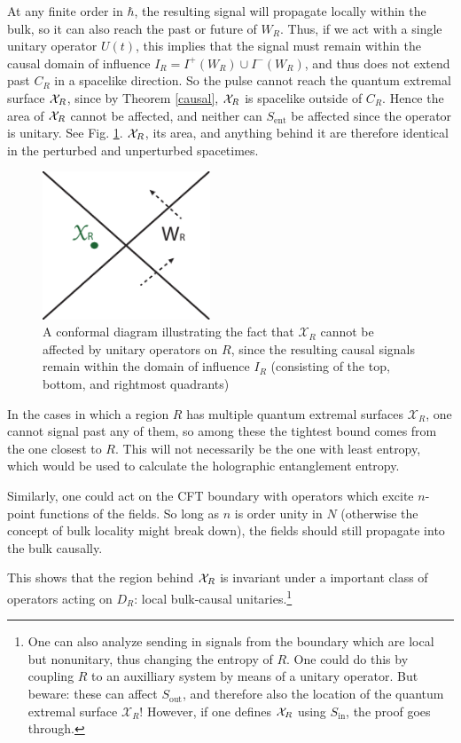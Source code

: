 \documentclass[12pt]{article}
\theoremstyle{remark}
\numberwithin{equation}{section}
\numberwithin{equation}{section}
\begin{document}
At any finite order in $\hbar$, the resulting signal will propagate locally within the bulk, so it can also reach the past or future of $W_R$.  Thus, if we act with a single unitary operator $U(t)$, this implies that the signal must remain within the causal domain of influence $I_R = I^+(W_R) \cup I^-(W_R)$, and thus does not extend past $C_R$ in a spacelike direction.  So the pulse cannot reach the quantum extremal surface ${\cal X}_R$, since by Theorem \ref{causal}, ${\cal X}_R$ is spacelike outside of $C_R$.  Hence the area of ${\cal X}_R$ cannot be affected, and neither can $S_\mathrm{ent}$ be affected since the operator is unitary.  See Fig. \ref{CausalSignal}.  ${\cal X}_R$, its area, and anything behind it are therefore identical in the perturbed and unperturbed spacetimes.

\begin{figure}[ht]
\begin{center}
\includegraphics[width=5cm]{CausalSignalsv2.pdf} 
\caption{\small{A conformal diagram illustrating the fact that $\mathcal{X}_{R}$ cannot be affected by unitary operators on $R$, since the resulting causal signals remain within the domain of influence $I_R$ (consisting of the top, bottom, and rightmost quadrants)}}
\label{CausalSignal}
\end{center}
\end{figure}

In the cases in which a region $R$ has multiple quantum extremal surfaces ${\mathcal{X}_R}$, one cannot signal past any of them, so among these the tightest bound comes from the one closest to $R$.  This will not necessarily be the one with least entropy, which would be used to calculate the holographic entanglement entropy.  

Similarly, one could act on the CFT boundary with operators which excite $n$-point functions of the fields.  So long as $n$ is order unity in $N$ (otherwise the concept of bulk locality might break down), the fields should still propagate into the bulk causally.

This shows that the region behind ${\cal X}_R$ is invariant under a important class of operators acting on $D_R$: local bulk-causal unitaries.\footnote{One can also analyze sending in signals from the boundary which are local but nonunitary, thus changing the entropy of $R$.  One could do this by coupling $R$ to an auxilliary system by means of a unitary operator.  But beware: these can affect $S_\mathrm{out}$, and therefore also the location of the quantum extremal surface $\mathcal{X}_{R}$!  However, if one defines ${\cal X}_R$ using $S_\mathrm{in}$, the proof goes through.}  
\end{document}
